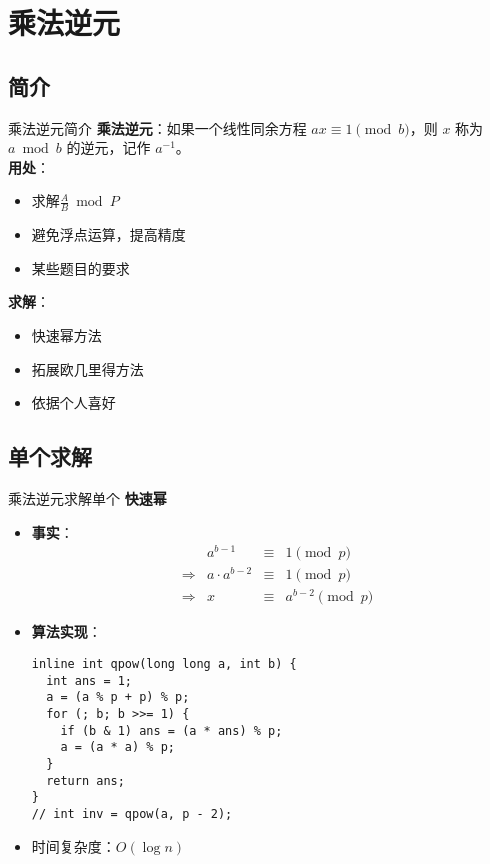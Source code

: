 \section{乘法逆元}
\subsection{简介}
\begin{frame}[fragile]{乘法逆元}{简介}
  \textbf{乘法逆元}：如果一个线性同余方程 $ax \equiv 1 \pmod b$，则 $x$ 称为 $a \bmod b$ 的逆元，记作 $a^{-1}$。\\
  
  \pause
  \vspace{0.5cm}
  \textbf{用处}：
  \begin{itemize}
    \item 求解$\frac{A}{B}\bmod{P}$
    \item 避免浮点运算，提高精度
    \item 某些题目的要求
  \end{itemize}
  
  \pause 
  \vspace{0.5cm}
  \textbf{求解}：
  \begin{itemize}
    \item 快速幂方法
    \item 拓展欧几里得方法
    \pause
    \item 依据个人喜好
  \end{itemize}

\end{frame}

\subsection{单个求解}
\begin{frame}[fragile]{乘法逆元}{求解单个}
  \textbf{快速幂}
  \begin{itemize}
    \item \textbf{事实}：
    $$
    \begin{aligned}
       &\;& a^{b-1} &\equiv& 1 \pmod p \\
      &\Rightarrow& a\cdot a^{b-2} &\equiv& 1 \pmod p \\ 
      &\Rightarrow& x &\equiv& a^{b-2} \pmod p
    \end{aligned}
    $$
    \pause 
    \item \textbf{算法实现}：
    \begin{lstlisting}
inline int qpow(long long a, int b) {
  int ans = 1;
  a = (a % p + p) % p;
  for (; b; b >>= 1) {
    if (b & 1) ans = (a * ans) % p;
    a = (a * a) % p;
  }
  return ans;
}
// int inv = qpow(a, p - 2);
    \end{lstlisting}
    \pause 
    \item 时间复杂度：$O(\log{n})$
  \end{itemize}
\end{frame}

